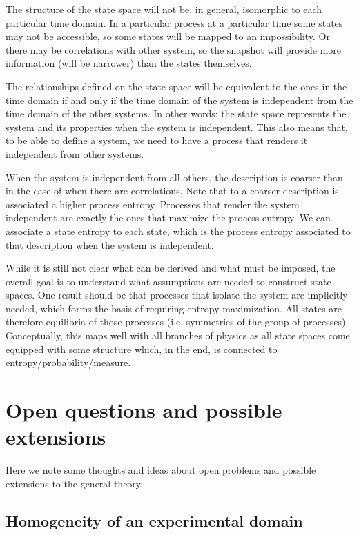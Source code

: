 \documentclass[11pt,letterpaper,fleqn]{memoir} %
\begin{document}
The structure of the state space will not be, in general, isomorphic to each particular time domain. In a particular process at a particular time some states may not be accessible, so some states will be mapped to an impossibility. Or there may be correlations with other system, so the snapshot will provide more information (will be narrower) than the states themselves.

The relationships defined on the state space will be equivalent to the ones in the time domain if and only if the time domain of the system is independent from the time domain of the other systems. In other words: the state space represents the system and its properties when the system is independent. This also means that, to be able to define a system, we need to have a process that renders it independent from other systems.

When the system is independent from all others, the description is coarser than in the case of when there are correlations. Note that to a coarser description is associated a higher process entropy. Processes that render the system independent are exactly the ones that maximize the process entropy. We can associate a state entropy to each state, which is the process entropy associated to that description when the system is independent.

While it is still not clear what can be derived and what must be imposed, the overall goal is to understand what assumptions are needed to construct state spaces. One result should be that processes that isolate the system are implicitly needed, which forms the basis of requiring entropy maximization. All states are therefore equilibria of those processes (i.e. symmetries of the group of processes). Conceptually, this maps well with all branches of physics as all state spaces come equipped with some structure which, in the end, is connected to entropy/probability/measure.

\section{Open questions and possible extensions}\label{sec:general_theory_extensions}

Here we note some thoughts and ideas about open problems and possible extensions to the general theory.

\subsection{Homogeneity of an experimental domain}
\end{document}
